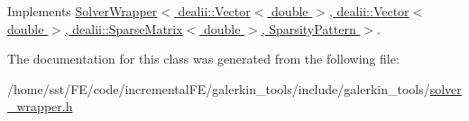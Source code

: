Implements \hyperlink{class_solver_wrapper_a75a599630086e2edee14eb43ae071733}{Solver\+Wrapper$<$ dealii\+::\+Vector$<$ double $>$, dealii\+::\+Vector$<$ double $>$, dealii\+::\+Sparse\+Matrix$<$ double $>$, Sparsity\+Pattern $>$}.



The documentation for this class was generated from the following file\+:\begin{DoxyCompactItemize}
\item 
/home/sst/\+F\+E/code/incremental\+F\+E/galerkin\+\_\+tools/include/galerkin\+\_\+tools/\hyperlink{solver__wrapper_8h}{solver\+\_\+wrapper.\+h}\end{DoxyCompactItemize}
